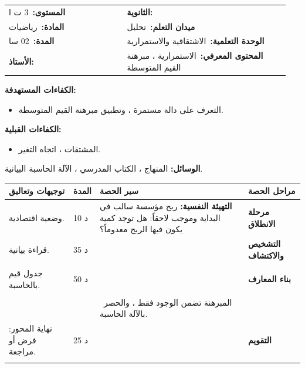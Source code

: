 \documentclass[12pt,a4paper]{article}
\makeatletter
\newenvironment{LTR}{\begin{otherlanguage}{english}}{\end{otherlanguage}}
\newcommand{\ar}[1]{\foreignlanguage{arabic}{#1}}
\newcommand{\Phase}[1]{\textbf{#1}}
\newcommand{\Fld}[2]{\textbf{#1:}\ #2}
\newcommand{\ModhHead}[9]{%
\begin{LTR}
\begin{tcolorbox}[enhanced,colback=white,colframe=cThm!85!black,arc=4mm,boxrule=1pt,top=14pt,bottom=6pt,left=8pt,right=8pt,
 overlay={\node[fill=cThm!85!black,text=white,rounded corners=3mm,inner xsep=14pt,inner ysep=4pt,font=\large\bfseries] at ([yshift=0pt]frame.north){\ar{مذكرة رقم #1}};},
 before upper={\selectlanguage{arabic}}]
\begin{tabular}{@{}p{0.4\linewidth}p{0.55\linewidth}@{}}
\Fld{المستوى}{#2} & \Fld{الثانوية}{\dotfill}\\[3pt]
\Fld{المادة}{رياضيات} & \Fld{ميدان التعلم}{#3}\\[3pt]
\Fld{المدة}{#5} & \Fld{الوحدة التعلمية}{#4}\\[3pt]
\Fld{الأستاذ}{\dotfill} & \Fld{المحتوى المعرفي}{#6}\\
\end{tabular}
\end{tcolorbox}
\begin{tcolorbox}[enhanced,colback=white,colframe=cThm!85!black,arc=3mm,boxrule=0.8pt,sidebyside,sidebyside align=top,lefthand ratio=0.5,
 segmentation style={dashed,cThm!60},before upper={\selectlanguage{arabic}},before lower={\selectlanguage{arabic}}]
\textbf{الكفاءات المستهدفة:}\par #8
\tcblower
\textbf{الكفاءات القبلية:}\par #7
\end{tcolorbox}
\end{LTR}
\par\smallskip\textbf{الوسائل:} #9\par\smallskip}
\newenvironment{Sayr}{%
\begin{LTR}\renewcommand{\arraystretch}{1.25}\setlength{\tabcolsep}{4pt}\relpenalty=10000\binoppenalty=10000\tolerance=9000\emergencystretch=0.3\linewidth
\begin{longtable}{|p{0.09\textwidth}|>{\centering\arraybackslash}p{0.05\textwidth}|p{0.71\textwidth}|>{\centering\arraybackslash}p{0.09\textwidth}|}
\hline\rowcolor{cThm!12}\ar{\footnotesize\textbf{توجيهات وتعاليق}} & \ar{\footnotesize\textbf{المدة}} & \ar{\textbf{سير الحصة}} & \ar{\footnotesize\textbf{مراحل الحصة}}\\\hline\endhead
\hline\endfoot}{\end{longtable}\end{LTR}}
\newcommand{\Row}[4]{\ar{\small #4} & \ar{#3} & \ar{#2} & \cellcolor{cThm!8}\ar{\Phase{#1}}\\\hline}
\newcommand{\Lab}[2]{\foreignlanguage{english}{\tcbox[on line,colback=#1,colframe=#1,boxrule=0pt,arc=2pt,boxsep=1pt,left=5pt,right=5pt,top=1pt,bottom=1pt]{\ar{\textcolor{white}{\textbf{#2}}}}}}
\newcommand{\RR}[1]{\ifmmode{\color{cThm}#1}\else$\mbox{\color{cThm}#1}$\fi}
\makeatother
\begin{document}
\newpage
\ModhHead{14}{3 ت ا}{تحليل}{الاشتقاقية والاستمرارية}{02 سا}{الاستمرارية ، مبرهنة القيم المتوسطة}%
{\begin{itemize}\item المشتقات ، اتجاه التغير.\end{itemize}}%
{\begin{itemize}\item التعرف على دالة مستمرة ، وتطبيق مبرهنة القيم المتوسطة.\end{itemize}}%
{المنهاج ، الكتاب المدرسي ، الآلة الحاسبة البيانية.}
\begin{Sayr}
\Row{مرحلة الانطلاق}{%
\textbf{التهيئة النفسية:} ربح مؤسسة سالب في البداية وموجب لاحقاً: هل توجد كمية يكون فيها الربح معدوماً؟}{10 د}{وضعية اقتصادية.}
\Row{التشخيص والاكتشاف}{%
\Lab{cEx}{وضعية مقترحة}\ $B(q)=-q^2+60q-400$ على $[0;30]$.\par\textbf{(1)} احسب $B(0)$ و $B(30)$.\par\textbf{(2)} هل توجد كمية $q_0$ بحيث $B(q_0)=0$ ؟}{35 د}{قراءة بيانية.}
\Row{}{%
\Lab{cDef}{مناقشة النشاط}\par\textbf{(1)} $B(0)=\RR{-400}$ ؛ $B(30)=-900+1800-400=\RR{500}$.\par\textbf{(2)} $B$ مستمرة على $[0;30]$ و $0$ محصور بين $-400$ و $500$: \RR{توجد} كمية $q_0$ ينعدم من أجلها الربح.}{}{}
\Row{بناء المعارف}{%
\Lab{cThm}{خاصية}\par\textbf{(1)} كثيرات الحدود والدوال الناطقة مستمرة على كل مجال من مجموعة تعريفها.\par\textbf{(2)} \textbf{مبرهنة القيم المتوسطة}: إذا كانت $f$ مستمرة على $[a;b]$ و $k$ محصوراً بين $f(a)$ و $f(b)$ فإن المعادلة $f(x)=k$ تقبل \RR{حلاً على الأقل} في $[a;b]$ ، و\RR{حلاً وحيداً} إذا كانت $f$ رتيبة تماماً.}{50 د}{جدول قيم بالحاسبة.}
\Row{}{%
\Lab{cEx}{مثال}\ $f(x)=x^3+x-3$ على $[1;2]$: $f^{\prime}(x)=3x^2+1>0$ ($f$ متزايدة تماماً) ، $f(1)=-1$ ، $f(2)=7$: حل وحيد $\alpha$.\par $f(1{,}2)\approx-0{,}07<0$ و $f(1{,}3)\approx0{,}50>0$ ، إذن $\RR{1{,}2<\alpha<1{,}3}$.}{}{}
\Row{}{%
\Lab{cThm!80!black}{حذار}\ المبرهنة تضمن الوجود فقط ، والحصر بالآلة الحاسبة.}{}{}
\Row{التقويم}{%
\Lab{cMeth}{تمرين تطبيقي}\par بالرجوع إلى $B(q)=-q^2+60q-400$.\par\textbf{(1)} بيّن أن الكمية $q_0$ التي ينعدم من أجلها الربح وحيدة في $[0;30]$.\par\textbf{(2)} احصر $q_0$ بين عددين طبيعيين متتابعين.}{25 د}{نهاية المحور: فرض أو مراجعة.}
\Row{}{%
\Lab{cEx}{حل التمرين التطبيقي}\par\textbf{(1)} $B^{\prime}(q)=-2q+60>0$ على $[0;30[$: $B$ متزايدة تماماً ومستمرة ، إذن الحل \RR{وحيد}.\par\textbf{(2)} $B(7)=-49+420-400=-29<0$ و $B(8)=-64+480-400=16>0$ ، إذن $\RR{7<q_0<8}$.\par\textbf{واجب منزلي:} تمارين من باب الاشتقاقية والاستمرارية.\par\smallskip\textbf{ملاحظات حول سير الحصة:} \dotfill}{}{}
\end{Sayr}
\end{document}
